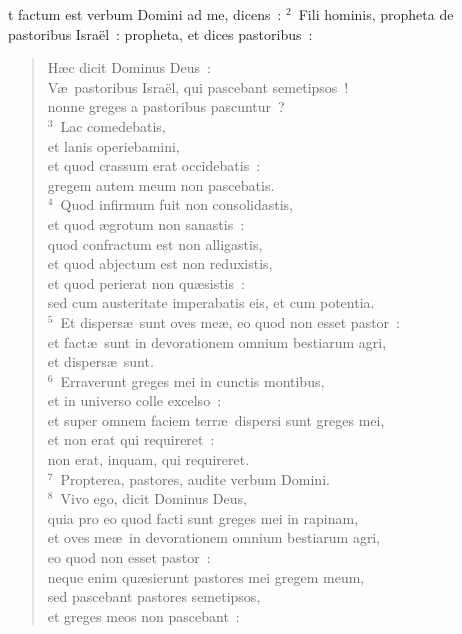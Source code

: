 \bchapter
{}t factum est verbum Domini ad me, dicens~:
${}^{2}$~Fili hominis, propheta de pastoribus Isra\"el~: propheta, et dices pastoribus~: \begin{flushleft}\begin{verse}H\ae c dicit Dominus Deus~:\\ V\ae\ pastoribus Isra\"el, qui pascebant semetipsos~!\\ nonne greges a pastoribus pascuntur~?\\
${}^{3}$~Lac comedebatis,\\ et lanis operiebamini,\\ et quod crassum erat occidebatis~:\\ gregem autem meum non pascebatis.\\
${}^{4}$~Quod infirmum fuit non consolidastis,\\ et quod \ae grotum non sanastis~:\\ quod confractum est non alligastis,\\ et quod abjectum est non reduxistis,\\ et quod perierat non qu\ae sistis~:\\ sed cum austeritate imperabatis eis, et cum potentia.\\
${}^{5}$~Et dispers\ae\ sunt oves me\ae , eo quod non esset pastor~:\\ et fact\ae\ sunt in devorationem omnium bestiarum agri,\\ et dispers\ae\ sunt.\\
${}^{6}$~Erraverunt greges mei in cunctis montibus,\\ et in universo colle excelso~:\\ et super omnem faciem terr\ae\ dispersi sunt greges mei,\\ et non erat qui requireret~:\\ non erat, inquam, qui requireret.\\
${}^{7}$~Propterea, pastores, audite verbum Domini.\\
${}^{8}$~Vivo ego, dicit Dominus Deus,\\ quia pro eo quod facti sunt greges mei in rapinam,\\ et oves me\ae\ in devorationem omnium bestiarum agri,\\ eo quod non esset pastor~:\\ neque enim qu\ae sierunt pastores mei gregem meum,\\ sed pascebant pastores semetipsos,\\ et greges meos non pascebant~:\\

\end{verse}
\end{flushleft}
